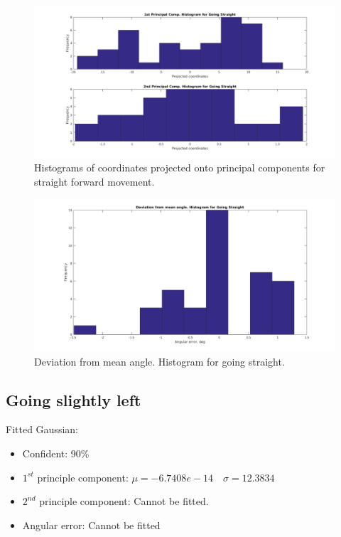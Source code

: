 \documentclass[paper=a4, fontsize=11pt]{scrartcl} %
\begin{document}
    \begin{figure}[h!]
        \begin{center}
            \setlength{\fboxsep}{0.5pt} %
            \setlength{\fboxrule}{0.5pt}
            \includegraphics[width=\linewidth,fbox]{images/pca_histogram_straight.png}
            \caption{Histograms of coordinates projected onto principal components for straight forward movement.}
        \end{center}
    \end{figure}
    \begin{figure}[h!]
        \begin{center}
            \setlength{\fboxsep}{0.5pt} %
            \setlength{\fboxrule}{0.5pt}
            \includegraphics[width=\linewidth,fbox]{images/histogram_1_phi_straight.png}
            \caption{Deviation from mean angle. Histogram for going straight.}
        \end{center}
    \end{figure}
	
    \newpage
    \subsection{Going slightly left}
    Fitted Gaussian:
    \begin{itemize}
    	\item Confident: 90\%
	    \item $1^{st}$ principle component: $\mu = -6.7408e-14 \quad \sigma = 12.3834$
	    \item $2^{nd}$ principle component: Cannot be fitted.
	    \item Angular error: Cannot be fitted
    \end{itemize}
    
\end{document}

